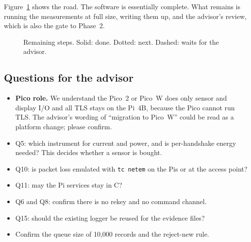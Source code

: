 \documentclass[11pt,a4paper]{article}
\newcommand{\prog}[1]{\texttt{#1}}
\begin{document}
Figure~\ref{fig:road} shows the road. The software is essentially complete. What remains is running the
measurements at full size, writing them up, and the advisor's review, which is also the gate to Phase~2.

\begin{figure}[!tbp]
\centering
{}
\caption{Remaining steps. Solid: done. Dotted: next. Dashed: waits for the advisor.}
\label{fig:road}
\end{figure}

\subsection{Questions for the advisor}

\begin{itemize}\setlength\itemsep{0pt}
\item \textbf{Pico role.} We understand the Pico~2 or Pico~W does only sensor and display I/O and all TLS stays
      on the Pi~4B, because the Pico cannot run TLS. The advisor's wording of ``migration to Pico~W'' could be read
      as a platform change; please confirm.
\item Q5: which instrument for current and power, and is per-handshake energy needed? This decides whether a sensor is bought.
\item Q10: is packet loss emulated with \prog{tc netem} on the Pis or at the access point?
\item Q11: may the Pi services stay in C?
\item Q6 and Q8: confirm there is no rekey and no command channel.
\item Q15: should the existing logger be reused for the evidence files?
\item Confirm the queue size of 10{,}000 records and the reject-new rule.
\end{itemize}
\end{document}
